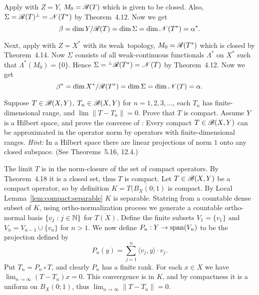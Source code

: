 \begin{enumerate}
Apply with \(Z = Y\), \(M_0 = \mathscr{R}(T)\) which is given to be closed.
Also, \(\Sigma = \mathscr{R}(T)^\perp = \mathscr{N}(T^*)\) by Theorem~4.12.
Now we get 
\begin{equation} 
   \beta = \dim Y / \mathscr{R}(T) = \dim \Sigma = \dim\mathscr{N}(T^*) = \alpha^*.
\end{equation}

Next, apply with \(Z=X^*\) with its weak\upstar\ topology,
\(M_0=\mathscr{R}(T^*)\) which is closed by Theorem~4.14.
Now \(\Sigma\) consists of all weak\upstar-continuous functionals \(\Lambda^*\)
on \(X^*\) such that \(\Lambda^*(M_0) = \{0\}\).
Hence \(\Sigma = {}^\perp\mathscr{R}(T^*) = \mathscr{N}(T)\) by Theorem~4.12. 
Now we get
\begin{equation*}
   \beta^* = \dim X^* / \mathscr{R}(T^*) = \dim \Sigma = \dim \mathscr{N}(T) = \alpha.
\end{equation*}


\begin{excopy}
\begin{itemize}
Suppose \(T \in \mathscr{B}(X,Y)\), \(T_n \in \mathscr{B}(X,Y)\) for \(n =1,2,3,\ldots\), 
each \(T_n\) has finite-dimensional
 range, and \(\lim \|T - T_n\| = 0\). Prove that $T$ is compact.
Assume $Y$ is a Hilbert space, and prove the converse of : Every compact
\(T \in \mathscr{B}(X,Y)\) can be approximated in the operator norm by operators with 
finite-dimensional ranges.
\emph{Hint:} In a Hilbert space there are linear projections of norm $1$
onto any closed subspace. (See Theorems~5.16, 12.4.)
\end{itemize}
\end{excopy}

\begin{itemize}
The limit $T$ is in the norm-closure of the set of compact operators.
By Theorem~4.18 it is a closed set, thus $T$ is compact.
Let \(T \in \mathscr{B}(X,Y)\) be a compact operator, so by definition
\(K = \overline{T(B_X(0;1)}\) is compact.
By Local Lemma~\ref{lem:compact:separable}
$K$ is separable. Statring from a countable dense subset of $K$,
using ortho-normalization process we generate a countable ortho-normal basis
\(\{v_j:j\in\mathbb{N}\}\) for \(\overline{T(X)}\).
Define the finite subsets \(V_1 = \{v_1\}\) and \(V_n = V_{n-1} \cup \{v_n\}\)
for \(n > 1\). 
We now define \(P_n:Y \to \mathop{\rm span}\nolimits(V_n)\) to be the projection defined by
\begin{equation*}
P_n(y) = \sum_{j=1}^n \langle v_j, y\rangle \cdot v_j.
\end{equation*}
Put \(T_n = P_n \circ T\), and clearly \(P_n\) has a finite rank.
For each \(x\in X\) we have \(\lim_{n\to\infty}(T - T_n)x = 0\).
This convergence is in $K$, and by compactness it is a uniform 
on \(B_X(0;1)\), thus \(\lim_{n\to\infty}\|T-T_n\| = 0\).
\end{itemize}



\end{enumerate}

